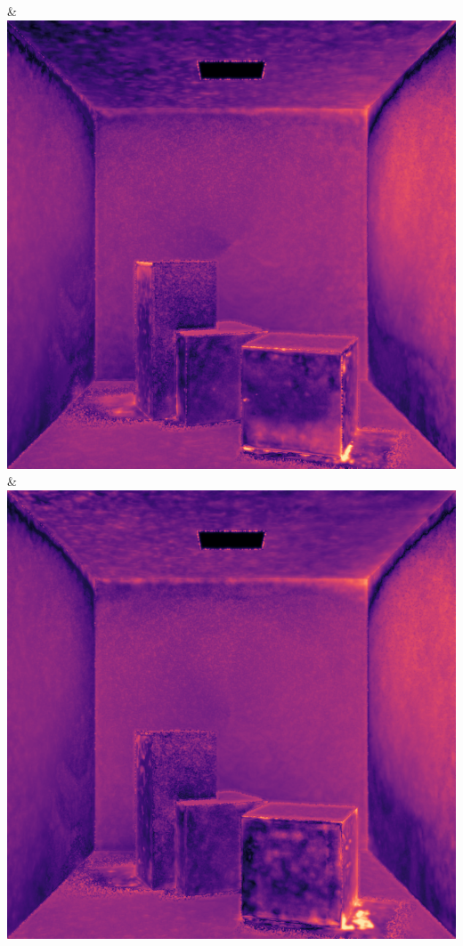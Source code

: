 & \includegraphics[width=\linewidth]{figures/py/tests/path_termination/1stvert_1spp_flip.png}
& \includegraphics[width=\linewidth]{figures/py/tests/path_termination/1stdiff_1spp_flip.png}
